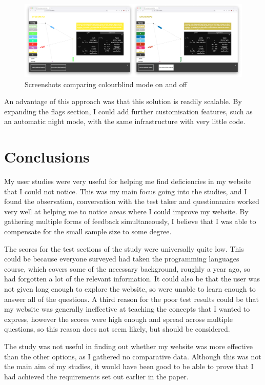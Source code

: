 \documentclass{l4proj}
\begin{document}
\begin{figure}[h!]
    \centering
    \includegraphics[width=1\linewidth]{dissertation/images/colourbind_collage.png}
    \caption{Screenshots comparing colourblind mode on and off}
    \label{fig:enter-label}
\end{figure}    

An advantage of this approach was that this solution is readily scalable.  By expanding the flags section, I could add further customisation features, such as an automatic night mode, with the same infrastructure with very little code.

\section{Conclusions}

My user studies were very useful for helping me find deficiencies in my website that I could not notice.  This was my main focus going into the studies, and I found the observation, conversation with the test taker and questionnaire worked very well at helping me to notice areas where I could improve my website.  By gathering multiple forms of feedback simultaneously, I believe that I was able to compensate for the small sample size to some degree.

The scores for the test sections of the study were universally quite low.  This could be because everyone surveyed had taken the programming languages course, which covers some of the necessary background, roughly a year ago, so had forgotten a lot of the relevant information.  It could also be that the user was not given long enough to explore the website, so were unable to learn enough to answer all of the questions.  A third reason for the poor test results could be that my website was generally ineffective at teaching the concepts that I wanted to express, however the scores were high enough and spread across multiple questions, so this reason does not seem likely, but should be considered.

The study was not useful in finding out whether my website was more effective than the other options, as I gathered no comparative data.  Although this was not the main aim of my studies, it would have been good to be able to prove that I had achieved the requirements set out earlier in the paper.
\end{document}
